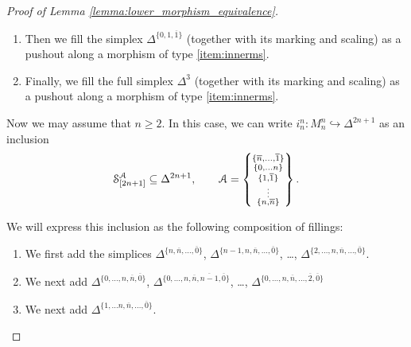 \documentclass[main.tex]{subfiles}
\begin{document}
\begin{proof}[Proof of Lemma \ref{lemma:lower_morphism_equivalence}]
\begin{enumerate}
    \item Then we fill the simplex $\Delta^{\{0,1,\overline{1}\}}$ (together with its marking and scaling) as a pushout along a morphism of type \ref{item:innerms}.

    \item Finally, we fill the full simplex $\Delta^{3}$ (together with its marking and scaling) as a pushout along a morphism of type \ref{item:innerms}.
  \end{enumerate}

  Now we may assume that $n \geq 2$. In this case, we can write $i^{n}_{n}\colon M^{n}_{n} \hookrightarrow \Delta^{2n+1}$ as an inclusion
  \begin{equation*}
    \S^{\mathcal{A}}_{[2n+1]} \subseteq \Delta^{2n+1},\qquad \mathcal{A} = \left\{ \substack{ \{\overline{n}, \ldots, \overline{1}\} \\ \{0, \ldots n\} \\ \{1, \overline{1}\} \\ \vdots \\ \{n, \overline{n}\} } \right\}.
  \end{equation*}


  We will express this inclusion as the following composition of fillings:
  \begin{enumerate}
    \item We first add the simplices $\Delta^{\{n, \overline{n}, \ldots, \overline{0}\}}$, $\Delta^{\{n-1, n, \overline{n}, \ldots, \overline{0}\}}$, \dots, $\Delta^{\{2, \ldots, n, \overline{n}, \ldots, \overline{0}\}}$.

    \item We next add $\Delta^{\{0, \ldots, n, \overline{n}, \overline{0}\}}$, $\Delta^{\{0, \ldots, n, \overline{n}, \overline{n-1}, \overline{0}\}}$, \dots, $\Delta^{\{0, \ldots, n, \overline{n}, \ldots, \overline{2}, \overline{0}\}}$

    \item We next add $\Delta^{\{1, \ldots n, \overline{n}, \ldots, \overline{0}\}}$.


\end{enumerate}
\end{proof}
\end{document}
